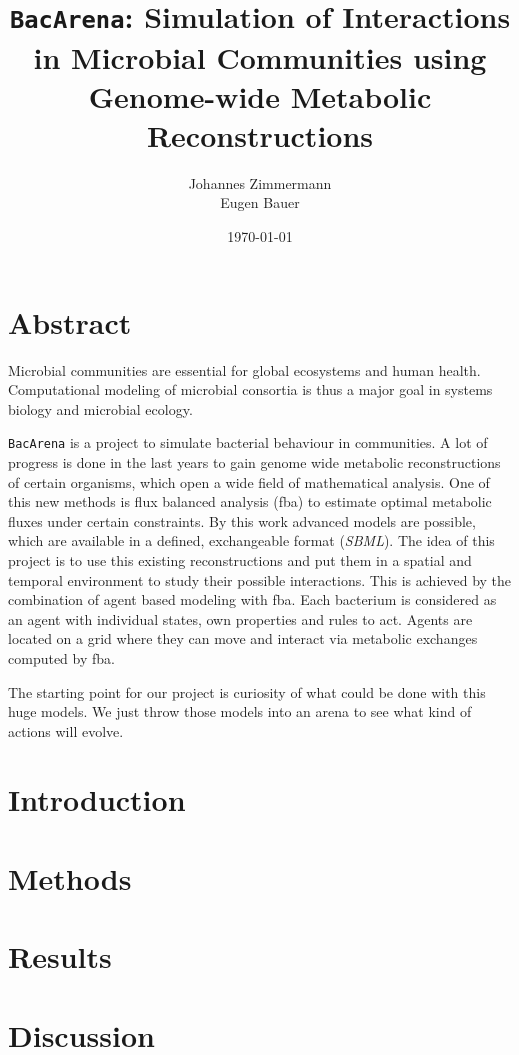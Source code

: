 \documentclass{scrartcl}
\title{\texttt{BacArena}: Simulation of Interactions in Microbial Communities using Genome-wide Metabolic Reconstructions}
\author{Johannes Zimmermann\\Eugen Bauer}
\date{\today}
\begin{document}
\maketitle

\section*{Abstract}
Microbial communities are essential for global ecosystems and human health.
Computational modeling of microbial consortia is thus a major goal in systems biology and microbial ecology. 

\texttt{BacArena} is a project to simulate bacterial behaviour in communities. A lot of progress is done in the last years to gain genome wide metabolic reconstructions of certain organisms, which open a wide field of mathematical analysis.
One of this new methods is flux balanced analysis (fba) to estimate optimal metabolic fluxes under certain constraints. By this work advanced models are possible, which are available in a defined, exchangeable format (\emph{SBML}). The idea of this project is to use this existing reconstructions and put them in a spatial and temporal environment to study their possible interactions.
This is achieved by the combination of agent based modeling with fba. Each bacterium is considered as an agent with individual states, own properties and rules to act. Agents are located on a grid where they can move and interact via metabolic exchanges computed by fba.

The starting point for our project is curiosity of what could be done with this huge models. We just throw those models into an arena to see what kind of actions will evolve.
\newpage

\tableofcontents

\newpage

\section{Introduction}


\section{Methods}


\section{Results}


\section{Discussion}



\printbibliography 
\end{document}

